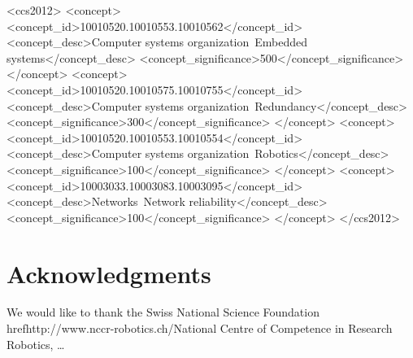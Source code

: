 \documentclass{sig-alternate-05-2015}
\begin{document}
%
%
\begin{CCSXML}
<ccs2012>
 <concept>
  <concept_id>10010520.10010553.10010562</concept_id>
  <concept_desc>Computer systems organization~Embedded systems</concept_desc>
  <concept_significance>500</concept_significance>
 </concept>
 <concept>
  <concept_id>10010520.10010575.10010755</concept_id>
  <concept_desc>Computer systems organization~Redundancy</concept_desc>
  <concept_significance>300</concept_significance>
 </concept>
 <concept>
  <concept_id>10010520.10010553.10010554</concept_id>
  <concept_desc>Computer systems organization~Robotics</concept_desc>
  <concept_significance>100</concept_significance>
 </concept>
 <concept>
  <concept_id>10003033.10003083.10003095</concept_id>
  <concept_desc>Networks~Network reliability</concept_desc>
  <concept_significance>100</concept_significance>
 </concept>
</ccs2012>  
\end{CCSXML}



%
%

%
%
\printccsdesc




\section{Acknowledgments}
We would like to thank the Swiss National Science Foundation href{http://www.nccr-robotics.ch/}{National Centre of Competence in Research Robotics}, \dots


  
\end{document}
